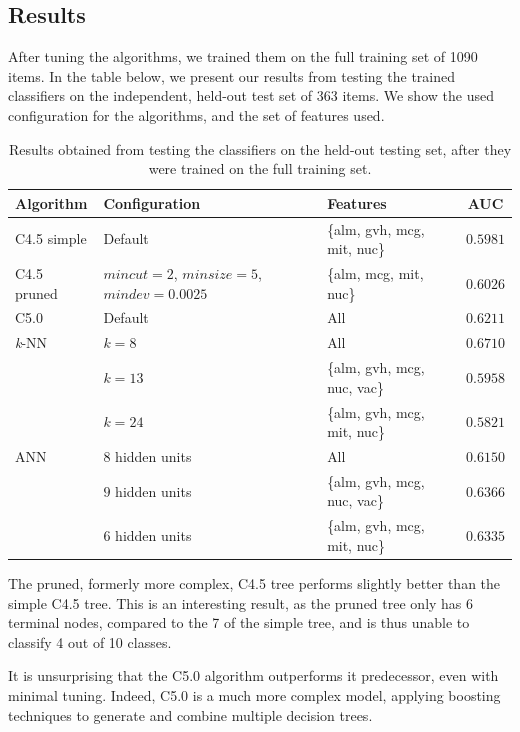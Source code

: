 \documentclass{article}
\begin{document}
\subsection{Results}

After tuning the algorithms, we trained them on the full training set of 1090 items. In the table below, we present our results from testing the trained classifiers on the independent, held-out test set of 363 items. We show the used configuration for the algorithms, and the set of features used.

\begin{table}[htbp]
\caption{Results obtained from testing the classifiers on the held-out testing set, after they were trained on the full training set.}
\begin{center}
\begin{tabular}{l l l c}
Algorithm & Configuration & Features & AUC \\
\hline  \hline
C4.5 simple & Default &  \{alm, gvh, mcg, mit, nuc\}& $0.5981$ \\
C4.5 pruned & $mincut=2$, $minsize=5$, $mindev=0.0025$ & \{alm, mcg, mit, nuc\}  & $0.6026$ \\
C5.0 & Default & All & $0.6211$ \\
\hline
 \textit{k}-NN & $k=8$ & All & $0.6710$ \\
 & $k=13$ & \{alm, gvh, mcg, nuc, vac\} & $0.5958$ \\
  & $k=24$ &\{alm, gvh, mcg, mit, nuc\} & $0.5821$ \\
 \hline
 ANN & $8$ hidden units & All & $0.6150$ \\
 & $9$ hidden units & \{alm, gvh, mcg, nuc, vac\} & $0.6366$ \\
  & $6$ hidden units & \{alm, gvh, mcg, mit, nuc\} & $0.6335$ \\
\end{tabular}
\end{center}
\label{default}
\end{table}%


The pruned, formerly more complex, C4.5 tree performs slightly better than the simple C4.5 tree. This is an interesting result, as the pruned tree only has 6 terminal nodes, compared to the 7 of the simple tree, and is thus unable to classify 4 out of 10 classes.

It is unsurprising that the C5.0 algorithm outperforms it predecessor, even with minimal tuning. Indeed, C5.0 is a much more complex model, applying boosting techniques to generate and combine multiple decision trees. 
\end{document}
